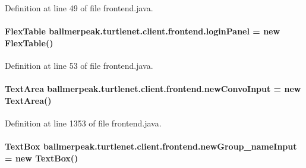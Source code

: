 Definition at line 49 of file frontend.\-java.

\hypertarget{classballmerpeak_1_1turtlenet_1_1client_1_1frontend_a8991d2d9a0c72e08986aa710d0e02278}{
\paragraph[{login\-Panel}]{\setlength{\rightskip}{0pt plus 5cm}Flex\-Table ballmerpeak.\-turtlenet.\-client.\-frontend.\-login\-Panel = new Flex\-Table()\hspace{0.3cm}{\ttfamily [private]}}}\label{classballmerpeak_1_1turtlenet_1_1client_1_1frontend_a8991d2d9a0c72e08986aa710d0e02278}


Definition at line 53 of file frontend.\-java.

\hypertarget{classballmerpeak_1_1turtlenet_1_1client_1_1frontend_a3a97955a4caeb2d7eec937a55e0f1505}{
\paragraph[{new\-Convo\-Input}]{\setlength{\rightskip}{0pt plus 5cm}Text\-Area ballmerpeak.\-turtlenet.\-client.\-frontend.\-new\-Convo\-Input = new Text\-Area()\hspace{0.3cm}{\ttfamily [private]}}}\label{classballmerpeak_1_1turtlenet_1_1client_1_1frontend_a3a97955a4caeb2d7eec937a55e0f1505}


Definition at line 1353 of file frontend.\-java.

\hypertarget{classballmerpeak_1_1turtlenet_1_1client_1_1frontend_a4516ddce9452d891a12579a0978b130f}{
\paragraph[{new\-Group\-\_\-name\-Input}]{\setlength{\rightskip}{0pt plus 5cm}Text\-Box ballmerpeak.\-turtlenet.\-client.\-frontend.\-new\-Group\-\_\-name\-Input = new Text\-Box()\hspace{0.3cm}{\ttfamily [package]}}}\label{classballmerpeak_1_1turtlenet_1_1client_1_1frontend_a4516ddce9452d891a12579a0978b130f}


